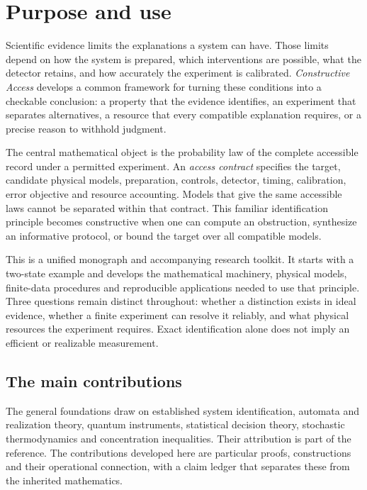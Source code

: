 \chapter*{Purpose and use}

Scientific evidence limits the explanations a system can have. Those limits
depend on how the system is prepared, which interventions are possible, what
the detector retains, and how accurately the experiment is calibrated.
\emph{Constructive Access} develops a common framework for turning these
conditions into a checkable conclusion: a property that the evidence
identifies, an experiment that separates alternatives, a resource that every
compatible explanation requires, or a precise reason to withhold judgment.

The central mathematical object is the probability law of the complete
accessible record under a permitted experiment. An \emph{access contract}
specifies the target, candidate physical models, preparation, controls,
detector, timing, calibration, error objective and resource accounting.
Models that give the same accessible laws cannot be separated within that
contract. This familiar identification principle becomes constructive when
one can compute an obstruction, synthesize an informative protocol, or bound
the target over all compatible models.

This is a unified monograph and accompanying research toolkit. It starts
with a two-state example and develops the mathematical machinery, physical
models, finite-data procedures and reproducible applications needed to use
that principle. Three questions remain distinct throughout: whether a
distinction exists in ideal evidence, whether a finite experiment can resolve
it reliably, and what physical resources the experiment requires. Exact
identification alone does not imply an efficient or realizable measurement.

\section*{The main contributions}

The general foundations draw on established system identification, automata
and realization theory, quantum instruments, statistical decision theory,
stochastic thermodynamics and concentration inequalities. Their attribution
is part of the reference. The contributions developed here are particular
proofs, constructions and their operational connection, with a claim ledger
that separates these from the inherited mathematics.

